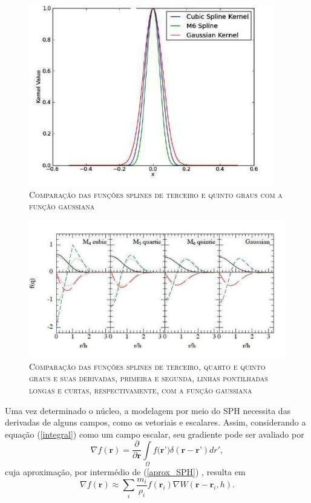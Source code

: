 \begin{figure}[H]
	\centering
	\includegraphics[scale=1]{figuras/nucleos.jpg}
	\caption{\textsc{Comparação das funções splines de terceiro e quinto graus com a função gaussiana}}
	\vspace{-0.1cm}
	\label{fig:nucleos}
\end{figure} 

\begin{figure}[H]
	\centering
	\includegraphics[scale=1]{figuras/pricePDF4.jpg}
	\caption{\textsc{Comparação das funções splines de terceiro, quarto e quinto graus e suas derivadas, primeira e segunda, linhas pontilhadas longas e curtas, respectivamente, com a função gaussiana}}
	\vspace{-0.1cm}
	\label{fig:pricePDF4}
\end{figure} 

Uma vez determinado o núcleo, a modelagem por meio do SPH necessita das derivadas de alguns campos, como os vetoriais e escalares. Assim, considerando a equação (\ref{integral}) como um campo escalar, seu gradiente pode ser avaliado por
\begin{equation}
\nabla f(\textbf{r}) = \frac{\partial}{\partial \textbf{r}} \int\limits_{\Omega} f({\textbf{r'}) \delta (\textbf{r} - \textbf{r'})}dr',
\end{equation}  
cuja aproximação, por intermédio de (\ref{aprox_SPH}) , resulta em
\begin{equation} \label{esc_SPH}
\nabla f(\textbf{r}) \approx \sum\limits_{i} \frac{m_{i}}{\rho_{i}} f(\textbf{r}_{i}) \nabla W(\textbf{r} - \textbf{r}_{i},h).
\end{equation}

